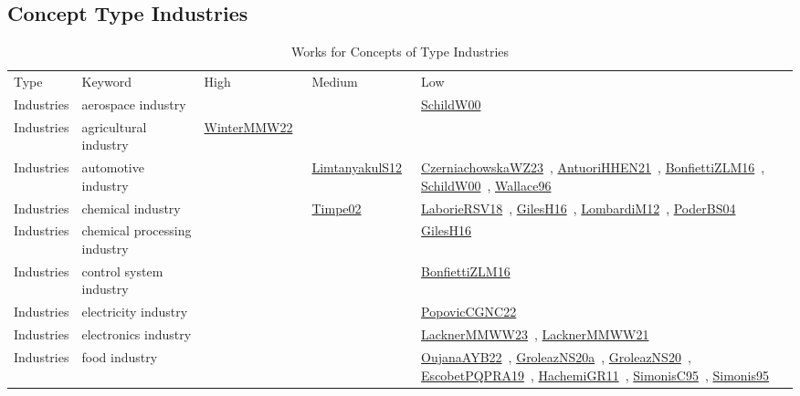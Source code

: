 \clearpage
\subsection{Concept Type Industries}
\label{sec:Industries}
{\scriptsize
\begin{longtable}{lp{3cm}>{\raggedright\arraybackslash}p{6cm}>{\raggedright\arraybackslash}p{6cm}>{\raggedright\arraybackslash}p{8cm}}
\rowcolor{white}\caption{Works for Concepts of Type Industries}\\ \toprule
\rowcolor{white}Type & Keyword & High & Medium & Low\\ \midrule\endhead
\bottomrule
\endfoot
Industries & aerospace industry &  &  & \href{works/SchildW00.pdf}{SchildW00}~\cite{SchildW00}\\
Industries & agricultural industry & \href{works/WinterMMW22.pdf}{WinterMMW22}~\cite{WinterMMW22} &  & \\
Industries & automotive industry &  & \href{works/LimtanyakulS12.pdf}{LimtanyakulS12}~\cite{LimtanyakulS12} & \href{works/CzerniachowskaWZ23.pdf}{CzerniachowskaWZ23}~\cite{CzerniachowskaWZ23}, \href{works/AntuoriHHEN21.pdf}{AntuoriHHEN21}~\cite{AntuoriHHEN21}, \href{works/BonfiettiZLM16.pdf}{BonfiettiZLM16}~\cite{BonfiettiZLM16}, \href{works/SchildW00.pdf}{SchildW00}~\cite{SchildW00}, \href{works/Wallace96.pdf}{Wallace96}~\cite{Wallace96}\\
Industries & chemical industry &  & \href{works/Timpe02.pdf}{Timpe02}~\cite{Timpe02} & \href{works/LaborieRSV18.pdf}{LaborieRSV18}~\cite{LaborieRSV18}, \href{works/GilesH16.pdf}{GilesH16}~\cite{GilesH16}, \href{works/LombardiM12.pdf}{LombardiM12}~\cite{LombardiM12}, \href{works/PoderBS04.pdf}{PoderBS04}~\cite{PoderBS04}\\
Industries & chemical processing industry &  &  & \href{works/GilesH16.pdf}{GilesH16}~\cite{GilesH16}\\
Industries & control system industry &  &  & \href{works/BonfiettiZLM16.pdf}{BonfiettiZLM16}~\cite{BonfiettiZLM16}\\
Industries & electricity industry &  &  & \href{works/PopovicCGNC22.pdf}{PopovicCGNC22}~\cite{PopovicCGNC22}\\
Industries & electronics industry &  &  & \href{works/LacknerMMWW23.pdf}{LacknerMMWW23}~\cite{LacknerMMWW23}, \href{works/LacknerMMWW21.pdf}{LacknerMMWW21}~\cite{LacknerMMWW21}\\
Industries & food industry &  &  & \href{works/OujanaAYB22.pdf}{OujanaAYB22}~\cite{OujanaAYB22}, \href{works/GroleazNS20a.pdf}{GroleazNS20a}~\cite{GroleazNS20a}, \href{works/GroleazNS20.pdf}{GroleazNS20}~\cite{GroleazNS20}, \href{works/EscobetPQPRA19.pdf}{EscobetPQPRA19}~\cite{EscobetPQPRA19}, \href{works/HachemiGR11.pdf}{HachemiGR11}~\cite{HachemiGR11}, \href{works/SimonisC95.pdf}{SimonisC95}~\cite{SimonisC95}, \href{works/Simonis95.pdf}{Simonis95}~\cite{Simonis95}\\

\end{longtable}}
